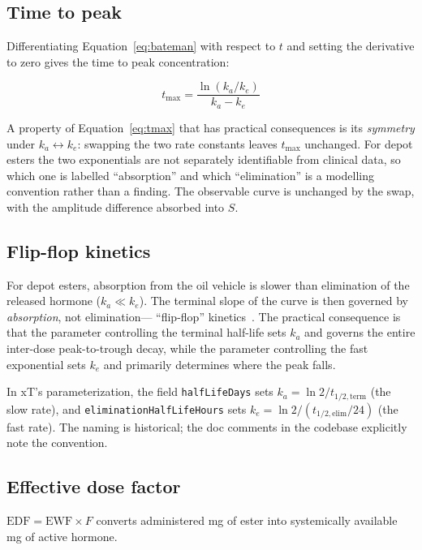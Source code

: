 \documentclass[11pt,a4paper]{article}
\newcommand{\code}[1]{\texttt{\small #1}}
\begin{document}
\subsection{Time to peak}
\label{sec:tmax}

Differentiating Equation~\ref{eq:bateman} with respect to $t$ and
setting the derivative to zero gives the time to peak concentration:

\begin{equation}
t_{\max} = \frac{\ln(k_a/k_e)}{k_a - k_e}
\label{eq:tmax}
\end{equation}

A property of Equation~\ref{eq:tmax} that has practical consequences is
its \emph{symmetry} under $k_a \leftrightarrow k_e$: swapping the two
rate constants leaves $t_{\max}$ unchanged. For depot esters the two
exponentials are not separately identifiable from clinical data, so
which one is labelled ``absorption'' and which ``elimination'' is a
modelling convention rather than a finding. The observable curve is
unchanged by the swap, with the amplitude difference absorbed into $S$.

\subsection{Flip-flop kinetics}
\label{sec:flipflop}

For depot esters, absorption from the oil vehicle is slower than
elimination of the released hormone ($k_a \ll k_e$). The terminal slope
of the curve is then governed by \emph{absorption}, not elimination---
``flip-flop'' kinetics~\cite{rowland2011}. The practical consequence is
that the parameter controlling the terminal half-life sets $k_a$ and
governs the entire inter-dose peak-to-trough decay, while the parameter
controlling the fast exponential sets $k_e$ and primarily determines
where the peak falls.

In xT's parameterization, the field \code{halfLifeDays} sets $k_a = \ln
2 / t_{1/2,\text{term}}$ (the slow rate), and
\code{eliminationHalfLifeHours} sets $k_e = \ln 2 / (t_{1/2,\text{elim}}
/ 24)$ (the fast rate). The naming is historical; the doc comments in
the codebase explicitly note the convention.

\subsection{Effective dose factor}
\label{sec:edf}

$\mathrm{EDF} = \mathrm{EWF} \times F$ converts administered mg of ester
into systemically available mg of active hormone.
\end{document}
